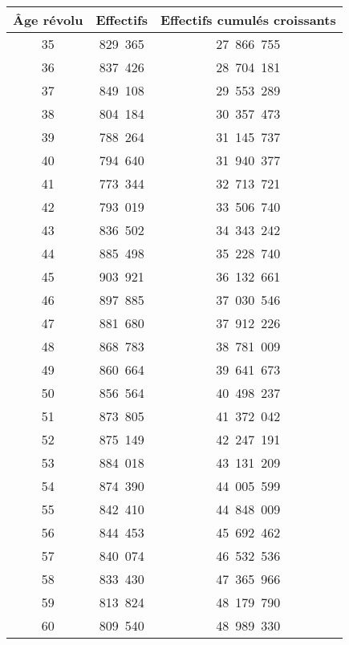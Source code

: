 \begin{center}
     \begin{tabular}{|c|c|c|}\hline %
          \textbf{Âge révolu}  &  \textbf{Effectifs}  &  \textbf{Effectifs cumulés croissants} \\ \hline
          35  &  829~365  &  27~866~755 \\ \hline
          36  &  837~426  &  28~704~181 \\ \hline
          37  &  849~108  &  29~553~289 \\ \hline
          38  &  804~184  &  30~357~473 \\ \hline
          39  &  788~264  &  31~145~737 \\ \hline
          40  &  794~640  &  31~940~377 \\ \hline
          41  &  773~344  &  32~713~721 \\ \hline
          42  &  793~019  &  33~506~740 \\ \hline
          43  &  836~502  &  34~343~242 \\ \hline
          44  &  885~498  &  35~228~740 \\ \hline
          45  &  903~921  &  36~132~661 \\ \hline
          46  &  897~885  &  37~030~546 \\ \hline
          47  &  881~680  &  37~912~226 \\ \hline
          48  &  868~783  &  38~781~009 \\ \hline
          49  &  860~664  &  39~641~673 \\ \hline
          50  &  856~564  &  40~498~237 \\ \hline
          51  &  873~805  &  41~372~042 \\ \hline
          52  &  875~149  &  42~247~191 \\ \hline
          53  &  884~018  &  43~131~209 \\ \hline
          54  &  874~390  &  44~005~599 \\ \hline
          55  &  842~410  &  44~848~009 \\ \hline
          56  &  844~453  &  45~692~462 \\ \hline
          57  &  840~074  &  46~532~536 \\ \hline
          58  &  833~430  &  47~365~966 \\ \hline
          59  &  813~824  &  48~179~790 \\ \hline
          60  &  809~540  &  48~989~330 \\ \hline

\end{tabular}
\end{center}
